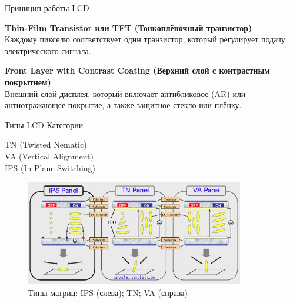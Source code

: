 \documentclass{beamer}
\begin{document}
\begin{frame}{Приницип работы LCD}
{			\textbf{Thin-Film Transistor или TFT (Тонкоплёночный транзистор)} \\
			Каждому пикселю соответствует один транзистор, который регулирует подачу электрического сигнала.
			
			\textbf{Front Layer with Contrast Coating (Верхний слой с контрастным покрытием)} \\
			Внешний слой дисплея, который включает антибликовое (AR) или антиотражающее покрытие, а также защитное стекло или плёнку.
	

		}

	\end{frame}

	\begin{frame}{Типы LCD}
		\footnotesize
		Категории

		TN (Twisted Nematic) \\
		VA (Vertical Alignment) \\
		IPS (In-Plane Switching) \\

		\begin{figure}
			\includegraphics[width=0.85\textwidth]{images/LCD-types.png}
			\caption {\href{https://4k-monitor.ru/about/howto/tipy_matric_monitorov/}{Типы матриц: IPS (слева); TN; VA (справа)}}
		\end{figure}

\end{frame}
\end{document}
